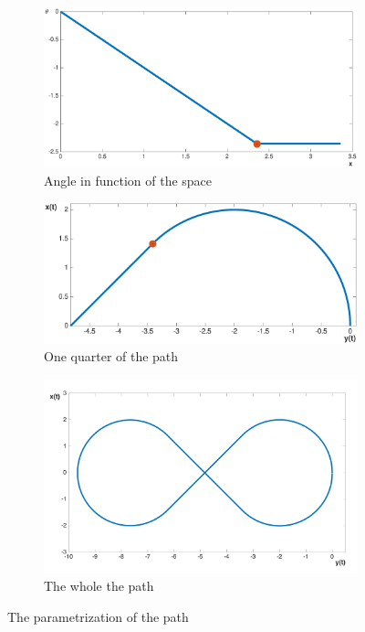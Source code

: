\begin{figure}[!htbp]
 \centering
   \begin{subfigure}[b]{0.42\textwidth}
     \includegraphics[width=\textwidth]{img/angle_x.eps}
        \caption{Angle in function of the space}
        \label{fig:quarter_theta}
   \end{subfigure}
   \hfill
   \begin{subfigure}[b]{0.45\textwidth}
     \includegraphics[width=\textwidth]{img/path_x_quarter.eps}
        \caption{One quarter of the path}
       \label{fig:quarter_xy}
   \end{subfigure}
   
   \begin{subfigure}[b]{0.45\textwidth}
     \includegraphics[width=\textwidth]{img/infinityshapepath.png}
        \caption{The whole the path}
       \label{fig:entire_xy2}
   \end{subfigure}
    \caption{The parametrization of the path}
  \label{fig:path}
  \end{figure}
  
